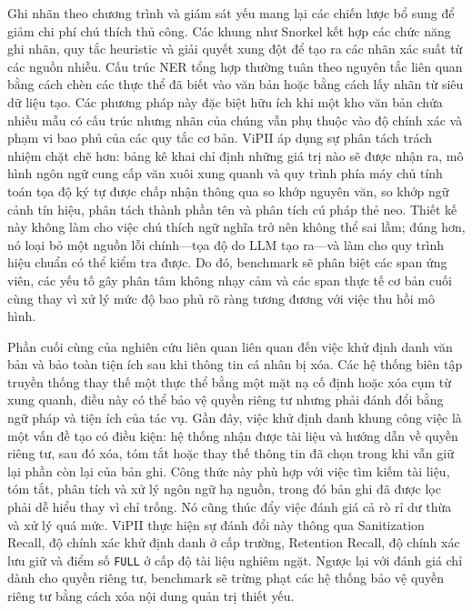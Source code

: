\documentclass[
  11pt,
  a4paper,
]{article}
\begin{document}
Ghi nhãn theo chương trình và giám sát yếu mang lại các chiến lược bổ
sung để giảm chi phí chú thích thủ công. Các khung như Snorkel kết hợp
các chức năng ghi nhãn, quy tắc heuristic và giải quyết xung đột để tạo
ra các nhãn xác suất từ \hspace{0pt}\hspace{0pt}các nguồn nhiễu. Cấu
trúc NER tổng hợp thường tuân theo nguyên tắc liên quan bằng cách chèn
các thực thể đã biết vào văn bản hoặc bằng cách lấy nhãn từ siêu dữ liệu
tạo. Các phương pháp này đặc biệt hữu ích khi một kho văn bản chứa nhiều
mẫu có cấu trúc nhưng nhãn của chúng vẫn phụ thuộc vào độ chính xác và
phạm vi bao phủ của các quy tắc cơ bản. ViPII áp dụng sự phân tách trách
nhiệm chặt chẽ hơn: bảng kê khai chỉ định những giá trị nào sẽ được nhận
ra, mô hình ngôn ngữ cung cấp văn xuôi xung quanh và quy trình phía máy
chủ tính toán tọa độ ký tự được chấp nhận thông qua so khớp nguyên văn,
so khớp ngữ cảnh tín hiệu, phân tách thành phần tên và phân tích cú pháp
thẻ neo. Thiết kế này không làm cho việc chú thích ngữ nghĩa trở nên
không thể sai lầm; đúng hơn, nó loại bỏ một nguồn lỗi chính---tọa độ do
LLM tạo ra---và làm cho quy trình hiệu chuẩn có thể kiểm tra được. Do
đó, benchmark sẽ phân biệt các span ứng viên, các yếu tố gây phân tâm
không nhạy cảm và các span thực tế cơ bản cuối cùng thay vì xử lý mức độ
bao phủ rõ ràng tương đương với việc thu hồi mô hình.

Phần cuối cùng của nghiên cứu liên quan liên quan đến việc khử định danh
văn bản và bảo toàn tiện ích sau khi thông tin cá nhân bị xóa. Các hệ
thống biên tập truyền thống thay thế một thực thể bằng một mặt nạ cố
định hoặc xóa cụm từ xung quanh, điều này có thể bảo vệ quyền riêng tư
nhưng phải đánh đổi bằng ngữ pháp và tiện ích của tác vụ. Gần đây, việc
khử định danh khung công việc là một vấn đề tạo có điều kiện: hệ thống
nhận được tài liệu và hướng dẫn về quyền riêng tư, sau đó xóa, tóm tắt
hoặc thay thế thông tin đã chọn trong khi vẫn giữ lại phần còn lại của
bản ghi. Công thức này phù hợp với việc tìm kiếm tài liệu, tóm tắt, phân
tích và xử lý ngôn ngữ hạ nguồn, trong đó bản ghi đã được lọc phải dễ
hiểu thay vì chỉ trống. Nó cũng thúc đẩy việc đánh giá cả rò rỉ dư thừa
và xử lý quá mức. ViPII thực hiện sự đánh đổi này thông qua Sanitization
Recall, độ chính xác khử định danh ở cấp trường, Retention Recall, độ
chính xác lưu giữ và điểm số \texttt{FULL} ở cấp độ tài liệu nghiêm
ngặt. Ngược lại với đánh giá chỉ dành cho quyền riêng tư, benchmark sẽ
trừng phạt các hệ thống bảo vệ quyền riêng tư bằng cách xóa nội dung
quản trị thiết yếu.
\end{document}
